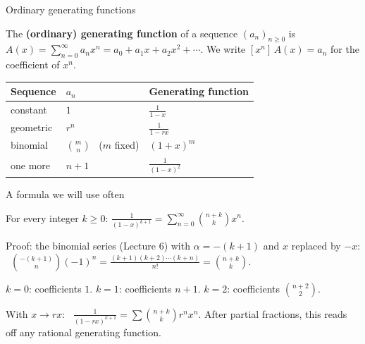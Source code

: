 \documentclass[10pt]{wosm-slides}
\newcommand{\coef}[1]{[x^{#1}]\,}
\begin{document}
\begin{frame}{Ordinary generating functions}
  \begin{definition}
    The \textbf{(ordinary) generating function} of a sequence $(a_n)_{n \ge 0}$ is
    $A(x) = \sum_{n=0}^\infty a_n x^n = a_0 + a_1 x + a_2 x^2 + \cdots$.
    We write $\coef{n} A(x) = a_n$ for the coefficient of $x^n$.
  \end{definition}
  \pause
  \begin{center}
  \small\renewcommand{\arraystretch}{1.25}
  \begin{tabular}{@{}lll@{}}
    \toprule
    \textbf{Sequence} & $a_n$ & \textbf{Generating function} \\
    \midrule
    constant      & $1$              & $\frac{1}{1-x}$ \\
    geometric     & $r^n$            & $\frac{1}{1-rx}$ \\
    binomial      & $\binom{m}{n}$ \ ($m$ fixed) & $(1 + x)^m$ \\
    one more      & $n + 1$          & $\frac{1}{(1-x)^2}$ \\
    \bottomrule
  \end{tabular}
  \end{center}
\end{frame}

\begin{frame}{A formula we will use often}
  \begin{lemma}
    For every integer $k \ge 0$: \quad
    $\displaystyle \frac{1}{(1-x)^{k+1}} = \sum_{n=0}^\infty \binom{n + k}{k} x^n$.
  \end{lemma}
  {\small Proof: the binomial series (Lecture 6) with $\alpha = -(k+1)$ and $x$ replaced by
  $-x$: \ $\binom{-(k+1)}{n} (-1)^n = \frac{(k+1)(k+2)\cdots(k+n)}{n!} = \binom{n+k}{k}$.\par}
  \pause
  \begin{example}
    $k = 0$: coefficients $1$. \quad $k = 1$: coefficients $n + 1$. \quad
    $k = 2$: coefficients $\binom{n+2}{2}$.
  \end{example}
  With $x \to rx$: \ $\frac{1}{(1 - rx)^{k+1}} = \sum \binom{n+k}{k} r^n x^n$.
  After partial fractions, this reads off any rational generating function.
\end{frame}
\end{document}
